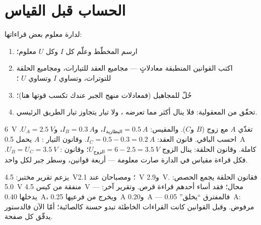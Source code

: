 \section{الحساب قبل القياس}

\begin{method}\label{met:g8:circuit-laws:solve}
لدارة معلوم بعض قراءاتها:
\begin{enumerate}
  \item ارسم المخطّط وعلّم كل $I$ وكل $U$ معلوم؛
  \item اكتب القوانين المنطبقة معادلاتٍ --- مجاميع العقد
        للتيارات، ومجاميع الحلقة للتوترات، وتساوي $I$ 
        وتساوي $U$ ؛
  \item حُلّ للمجاهيل (فمعادلات منهج الجبر عندك تكسب قوتها
        هنا)؛
  \item تحقّق من المعقولية: فلا  ينال أكثر مما تعرضه
        ، ولا تيار  يتجاوز تيار الطريق الرئيسي.
\end{enumerate}
\end{method}

\begin{example}\label{ex:g8:circuit-laws:worked}
 \qty{6}{V} تغذّي  $A$  مع زوج  ($B$ و$C$). والمقيس: $I_{\text{البطارية}} = \qty{0.5}{A}$،
و$I_B = \qty{0.3}{A}$، و$U_A = \qty{2.5}{V}$. احسب الباقي.
قانون العقد: $I_C = 0.5 - 0.3 = \qty{0.2}{A}$. وقانون التيار
:  $A$ يحمل \qty{0.5}{A} كاملة. وقانون 
الحلقة: ينال الزوج $U_{\text{الزوج}} = 6 - 2.5 = \qty{3.5}{V}$؛
وقانون  : $U_B = U_C = \qty{3.5}{V}$. فكل
قراءة مقياس في الدارة صارت معلومة --- أربعة قوانين، وسطر جبر
لكل واحد.
\end{example}

\begin{example}\label{ex:g8:circuit-laws:liedetector}
يزعم تقرير مختبر:  \qty{4.5}{V}؛ ومصباحان 
عند \qty{2.1}{V} و\qty{2.9}{V}. فقانون الحلقة يجمع الحصص:
\qty{5.0}{V} منفقة من كيس \qty{4.5}{V} --- محال؛ فقد أساء أحدهم
قراءة قرص. وتقرير آخر:  يدخلها \qty{0.40}{A}، ويخرج من
فرعيها \qty{0.25}{A} و\qty{0.20}{A} --- فالمفترق ``يخلق''
\qty{0.05}{A}: مرفوض. وقبل القوانين كانت القراءات الخاطئة تبدو
حسنة كالصائبة؛ أمّا الآن فالدستور يدقّق كل صفحة.
\end{example}

